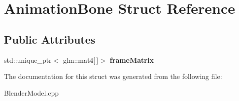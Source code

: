 \hypertarget{structAnimationBone}{\section{\-Animation\-Bone \-Struct \-Reference}
\label{structAnimationBone}
}
\subsection*{\-Public \-Attributes}
\begin{DoxyCompactItemize}
\item 
\hypertarget{structAnimationBone_aa6a6274317e040d088d0ef62c4b59113}{std\-::unique\-\_\-ptr$<$ glm\-::mat4\mbox{[}$\,$\mbox{]}$>$ {\bfseries frame\-Matrix}}\label{structAnimationBone_aa6a6274317e040d088d0ef62c4b59113}

\end{DoxyCompactItemize}


\-The documentation for this struct was generated from the following file\-:\begin{DoxyCompactItemize}
\item 
\-Blender\-Model.\-cpp\end{DoxyCompactItemize}
